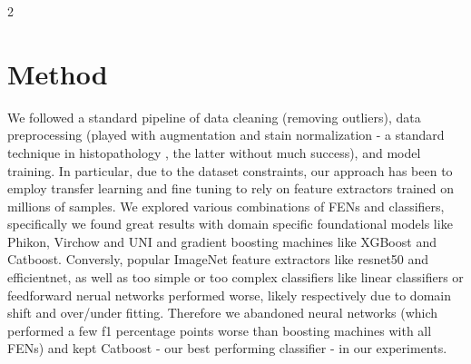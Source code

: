 \documentclass[11pt]{article}
\begin{document}
\begin{multicols}{2}
        \section{Method}
        We followed a standard pipeline of data cleaning (removing outliers), data preprocessing (played with augmentation and stain normalization - a standard technique in histopathology \cite{Tellez_2019}, the latter without much success), and model training.
        In particular, due to the dataset constraints, our approach has been to employ transfer learning and fine tuning to rely on feature extractors trained on millions of samples. We explored various combinations of FENs and classifiers, specifically we found great results with domain specific foundational models like Phikon\cite{filiot2024phikonv2largepublicfeature}, Virchow\cite{vorontsov2024virchowmillionslidedigitalpathology} and UNI\cite{chen2024towards-ccc} and gradient boosting machines like XGBoost and Catboost. 
        Conversly, popular ImageNet feature extractors like resnet50 and efficientnet, as well as too simple or too complex classifiers like linear classifiers or feedforward nerual networks performed worse, likely respectively due to domain shift and over/under fitting.
        Therefore we abandoned neural networks (which performed a few f1 percentage points worse than boosting machines with all FENs) and kept Catboost - our best performing classifier - in our experiments. 


\end{multicols}
\end{document}
